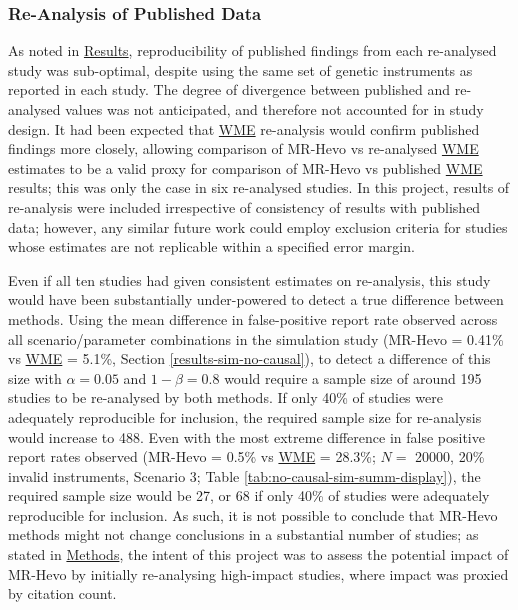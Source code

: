 \documentclass[
]{article}
\begin{document}
\subsubsection{Re-Analysis of Published Data}\label{lim-cite}

As noted in \hyperref[results]{Results}, reproducibility of published findings from each re-analysed study was sub-optimal, despite using the same set of genetic instruments as reported in each study. The degree of divergence between published and re-analysed values was not anticipated, and therefore not accounted for in study design. It had been expected that \hyperref[acronyms_WME]{WME} re-analysis would confirm published findings more closely, allowing comparison of MR-Hevo vs re-analysed \hyperref[acronyms_WME]{WME} estimates to be a valid proxy for comparison of MR-Hevo vs published \hyperref[acronyms_WME]{WME} results; this was only the case in six re-analysed studies. In this project, results of re-analysis were included irrespective of consistency of results with published data; however, any similar future work could employ exclusion criteria for studies whose estimates are not replicable within a specified error margin.

Even if all ten studies had given consistent estimates on re-analysis, this study would have been substantially under-powered to detect a true difference between methods. Using the mean difference in false-positive report rate observed across all scenario/parameter combinations in the simulation study (MR-Hevo = 0.41\% vs \hyperref[acronyms_WME]{WME} = 5.1\%, Section \ref{results-sim-no-causal}), to detect a difference of this size with \(\alpha = 0.05\) and \(1 - \beta = 0.8\) would require a sample size of around 195 studies to be re-analysed by both methods. If only 40\% of studies were adequately reproducible for inclusion, the required sample size for re-analysis would increase to 488. Even with the most extreme difference in false positive report rates observed (MR-Hevo = 0.5\% vs \hyperref[acronyms_WME]{WME} = 28.3\%; \(N =\) 20000, 20\% invalid instruments, Scenario 3; Table \ref{tab:no-causal-sim-summ-display}), the required sample size would be 27, or 68 if only 40\% of studies were adequately reproducible for inclusion. As such, it is not possible to conclude that MR-Hevo methods might not change conclusions in a substantial number of studies; as stated in \hyperref[methods]{Methods}, the intent of this project was to assess the potential impact of MR-Hevo by initially re-analysing high-impact studies, where impact was proxied by citation count.
\end{document}
